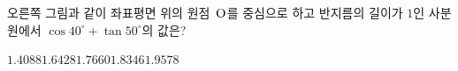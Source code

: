 \noindent\begin{minipage}[t]{0.58\linewidth}\vspace{0pt}\raggedright 오른쪽 그림과 같이 좌표평면 위의 원점~$\mathrm{O}$를 중심으로 하고 반지름의 길이가 $1$인 사분원에서 $\cos 40^\circ+\tan 50^\circ$의 값은?\end{minipage}\hfill\begin{minipage}[t]{0.4\linewidth}\vspace{0pt}\centering \resizebox{\ifdim\width>\linewidth\linewidth\else\width\fi}{!}{}\end{minipage}\par
\begin{choicesii}{$1.4088$}{$1.6428$}{$1.7660$}{$1.8346$}{$1.9578$}\end{choicesii}
